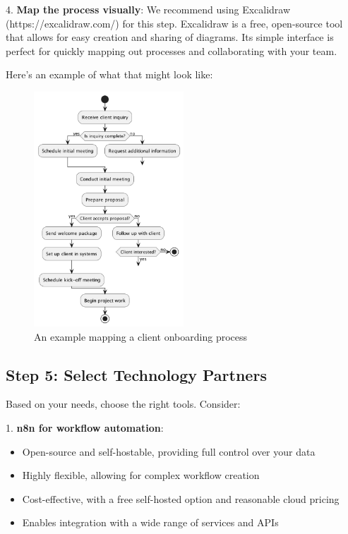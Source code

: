 4. \textbf{Map the process visually}:
   We recommend using Excalidraw (https://excalidraw.com/) for this step. Excalidraw is a free, open-source tool that allows for easy creation and sharing of diagrams. Its simple interface is perfect for quickly mapping out processes and collaborating with your team.

Here's an example of what that might look like:

\begin{figure}[H]
    \centering
    \includegraphics[width=0.5\textwidth]{figures/04-automation-roadmap-process}
    \caption{An example mapping a client onboarding process}
    \label{fig:client-automation-mapping-example}
\end{figure}

\subsection{Step 5: Select Technology Partners}

Based on your needs, choose the right tools. Consider:

1. \textbf{n8n for workflow automation}:
   \begin{itemize}
     \item Open-source and self-hostable, providing full control over your data
     \item Highly flexible, allowing for complex workflow creation
     \item Cost-effective, with a free self-hosted option and reasonable cloud pricing
     \item Enables integration with a wide range of services and APIs
   \end{itemize}

